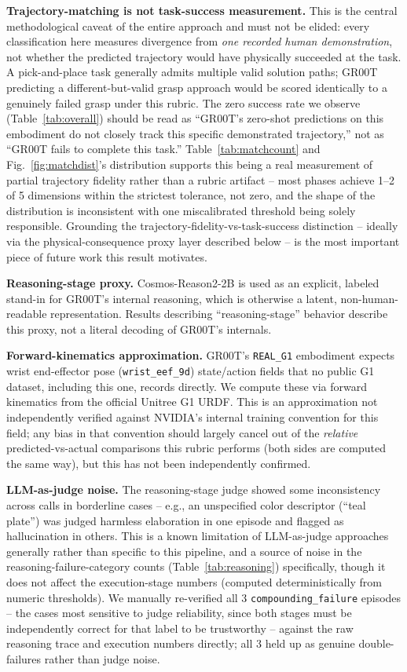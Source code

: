 \documentclass[conference]{IEEEtran}
\begin{document}
\textbf{Trajectory-matching is not task-success measurement.} This is the central
methodological caveat of the entire approach and must not be elided: every
classification here measures divergence from \emph{one recorded human demonstration},
not whether the predicted trajectory would have physically succeeded at the task. A
pick-and-place task generally admits multiple valid solution paths; GR00T predicting a
different-but-valid grasp approach would be scored identically to a genuinely failed
grasp under this rubric. The zero success rate we observe (Table~\ref{tab:overall})
should be read as ``GR00T's zero-shot predictions on this embodiment do not closely track
this specific demonstrated trajectory,'' not as ``GR00T fails to complete this task.''
Table~\ref{tab:matchcount} and Fig.~\ref{fig:matchdist}'s distribution supports this
being a real measurement of partial trajectory fidelity rather than a rubric artifact --
most phases achieve 1--2 of 5 dimensions within the strictest tolerance, not zero, and the
shape of the distribution
is inconsistent with one miscalibrated threshold being solely responsible. Grounding the
trajectory-fidelity-vs-task-success distinction -- ideally via the physical-consequence
proxy layer described below -- is the most important piece of future work this result
motivates.

\textbf{Reasoning-stage proxy.} Cosmos-Reason2-2B is used as an explicit, labeled stand-in
for GR00T's internal reasoning, which is otherwise a latent, non-human-readable
representation. Results describing ``reasoning-stage'' behavior describe this proxy, not
a literal decoding of GR00T's internals.

\textbf{Forward-kinematics approximation.} GR00T's \texttt{REAL\_G1} embodiment expects
wrist end-effector pose (\texttt{wrist\_eef\_9d}) state/action fields that no public G1
dataset, including this one, records directly. We compute these via forward kinematics
from the official Unitree G1 URDF. This is an approximation not independently verified
against NVIDIA's internal training convention for this field; any bias in that convention
should largely cancel out of the \emph{relative} predicted-vs-actual comparisons this
rubric performs (both sides are computed the same way), but this has not been
independently confirmed.

\textbf{LLM-as-judge noise.} The reasoning-stage judge showed some inconsistency across
calls in borderline cases -- e.g., an unspecified color descriptor (``teal plate'') was
judged harmless elaboration in one episode and flagged as hallucination in others. This
is a known limitation of LLM-as-judge approaches generally rather than specific to this
pipeline, and a source of noise in the reasoning-failure-category counts
(Table~\ref{tab:reasoning}) specifically, though it does not affect the execution-stage
numbers (computed deterministically from numeric thresholds). We manually re-verified all
3 \texttt{compounding\_failure} episodes -- the cases most sensitive to judge reliability,
since both stages must be independently correct for that label to be trustworthy --
against the raw reasoning trace and execution numbers directly; all 3 held up as genuine
double-failures rather than judge noise.
\end{document}
